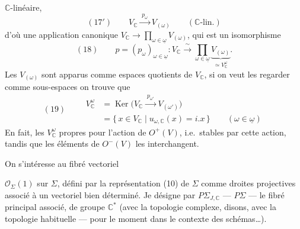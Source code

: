 \documentclass[11pt,a4paper]{article}
\begin{document}
$\mathbb{C}$-linéaire, 
\[
  (17')\qquad V_{\mathbb{C}} \xrightarrow{\;p_\omega\;} V_{(\omega)}
  \qquad (\mathbb{C}\text{-lin.})
\]
d'où une application  canonique
$V_{\mathbb{C}} \to \prod_{\omega \in \underline{\omega}} V_{(\omega)}$,
qui est un isomorphisme
\[
  (18)\qquad p = (p_\omega)_{\omega \in \underline{\omega}} : V_{\mathbb{C}}
  \xrightarrow{\;\sim\;} \prod_{\omega \in \underline{\omega}}
  \underbrace{V_{(\omega)}}_{\simeq V_{\mathbb{C}}^{\omega}} .
\]
Les $V_{(\omega)}$ sont apparus comme espaces quotients de $V_{\mathbb{C}}$,
si on veut les regarder comme sous-espaces  on trouve que
\[
  (19)\qquad
  \begin{aligned}
    V_{\mathbb{C}}^{\omega}
    &= \operatorname{Ker}\bigl(V_{\mathbb{C}} \xrightarrow{\;p_{\omega'}\;}
       V_{(\omega')}\bigr) \\
    &= \{\, x \in V_{\mathbb{C}} \mid u_{\omega,\mathbb{C}}(x) = i.x \,\}
       \qquad (\omega \in \underline{\omega})
  \end{aligned}
\]
En fait, les $V_{\mathbb{C}}^{\omega}$  propres
pour l'action de $O^{+}(V)$, i.e.\ stables par cette action, tandis que les
éléments de $O^{-}(V)$ les interchangent.

On s'intéresse au fibré vectoriel

$\mathcal{O}_\Sigma(1)$ sur $\Sigma$, défini par la représentation (10) de
$\Sigma$ comme   droites projectives
associé à un vectoriel bien déterminé. Je désigne par
$P\Sigma_{J,\mathbb{C}}$ ---  $P\Sigma$ --- le fibré
principal associé, de groupe $\mathbb{C}^{*}$ (avec la topologie complexe,
disons, avec la topologie habituelle --- pour le moment \ill{} dans le
contexte des schémas…). \struck{\ill{}}
\end{document}

